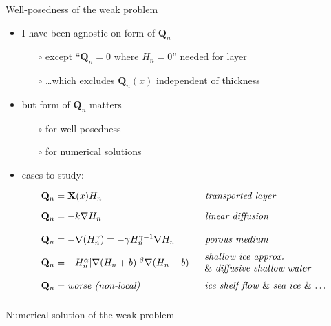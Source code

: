 \documentclass{beamer}
\newcommand\bQ{\mathbf{Q}}
\newcommand\bX{\mathbf{X}}
\newcommand{\grad}{\nabla}
\begin{document}
\begin{frame}{Well-posedness of the weak problem}
\begin{itemize}
\item I have been agnostic on form of $\bQ_n$
  \begin{itemize}
  \item[$\circ$] except ``$\bQ_n=0$ where $H_n=0$'' needed for layer
  \item[$\circ$] \dots which excludes $\bQ_n(x)$ independent of thickness
  \end{itemize}
\item<2-> but form of $\bQ_n$ matters
  \begin{itemize}
  \item[$\circ$] for well-posedness
  \item[$\circ$] for numerical solutions
  \end{itemize}
\item<3> cases to study:\small
$$\begin{array}{ll}
  \bQ_n = \bX(x) H_n & \text{\phantom{\Big|}\emph{transported layer}} \\
  \bQ_n = -k \grad H_n & \text{\phantom{\bigg|}\emph{linear diffusion}} \\
  \bQ_n = - \grad(H_n^\gamma) = - \gamma H_n^{\gamma-1} \grad H_n
     & \text{\phantom{\Big|}\emph{porous medium}}\phantom{\bigg|} \\
  \bQ_n = - H_n^\alpha |\grad (H_n+b)|^\beta \grad (H_n+b)\phantom{\bigg|} &
        \hspace{-0.75mm}\begin{array}{ll}
        \text{\emph{shallow ice approx.}} \\
        \text{\& \emph{diffusive shallow water}}
        \end{array} \\
  \bQ_n = \text{\emph{worse (non-local)}}\phantom{\bigg|} & \hspace{-0.75mm}\begin{array}{ll}
        \text{\emph{ice shelf flow} \& \emph{sea ice} \& \dots}
        \end{array}
\end{array}$$
\end{itemize}
\end{frame}

\begin{frame}{Numerical solution of the weak problem}

\begin{center}
\end{center}
\end{frame}
\end{document}
